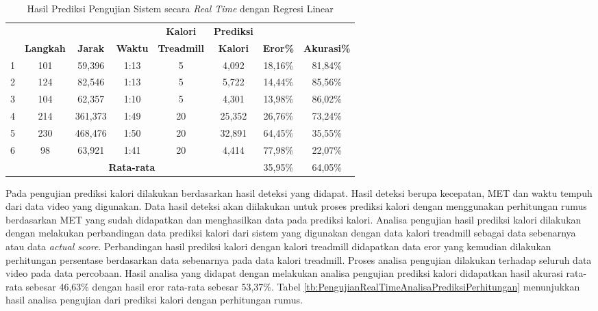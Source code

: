 \begin{longtable}{|c|c|c|c|c|c|c|c|}
  \caption{Hasil Prediksi Pengujian Sistem secara \emph{Real Time} dengan Regresi Linear}
  \label{tb:PengujianRealTimeAnalisaPrediksiRegresi}                                   \\
  \hline
  \rowcolor[HTML]{C0C0C0}
  & & & & \textbf{Kalori} & \textbf{Prediksi} & & \\
  \rowcolor[HTML]{C0C0C0}
  \multirow{-2}{*}{\textbf{Percobaan}} & \multirow{-2}{*}{\textbf{Langkah}} & \multirow{-2}{*}{\textbf{Jarak}} & \multirow{-2}{*}{\textbf{Waktu}} & \textbf{Treadmill} & \textbf{Kalori} & \multirow{-2}{*}{\textbf{Eror\%}} & \multirow{-2}{*}{\textbf{Akurasi\%}} \\
  
  \hline 
  1   & 101   & 59,396     & 1:13    & 5    & 4,092    & 18,16\%      & 81,84\%   \\
  \hline  
  2   & 124   & 82,546     & 1:13    & 5    & 5,722    & 14,44\%      & 85,56\%  \\
  \hline
  3   & 104   & 62,357     & 1:10    & 5    & 4,301    & 13,98\%      & 86,02\%   \\
  \hline
  4   & 214   & 361,373    & 1:49    & 20    & 25,352  & 26,76\%      & 73,24\%  \\
  \hline
  5   & 230   & 468,476    & 1:50    & 20    & 32,891  & 64,45\%      & 35,55\%    \\
  \hline
  6   & 98    & 63,921     & 1:41    & 20    & 4,414   & 77,98\%      & 22,07\%   \\
  \hline

  \multicolumn{6}{|c|}{\textbf{Rata-rata}} & 35,95\% & 64,05\% \\
  \hline
\end{longtable}

Pada pengujian prediksi kalori dilakukan berdasarkan hasil deteksi yang didapat. Hasil deteksi berupa kecepatan, MET dan waktu tempuh dari data video yang digunakan. Data hasil deteksi akan diilakukan untuk proses prediksi kalori dengan menggunakan perhitungan rumus berdasarkan MET yang sudah didapatkan dan menghasilkan data pada prediksi kalori. Analisa pengujian hasil prediksi kalori dilakukan dengan melakukan perbandingan data prediksi kalori dari sistem yang digunakan dengan data kalori treadmill sebagai data sebenarnya atau data \emph{actual score}. Perbandingan hasil prediksi kalori dengan kalori treadmill didapatkan data eror yang kemudian dilakukan perhitungan persentase berdasarkan data sebenarnya pada data kalori treadmill. Proses analisa pengujian dilakukan terhadap seluruh data video pada data percobaan. Hasil analisa yang didapat dengan melakukan analisa pengujian prediksi kalori didapatkan hasil akurasi rata-rata sebesar 46,63\% dengan hasil eror rata-rata sebesar 53,37\%. Tabel \ref{tb:PengujianRealTimeAnalisaPrediksiPerhitungan} menunjukkan hasil analisa pengujian dari prediksi kalori dengan perhitungan rumus.

